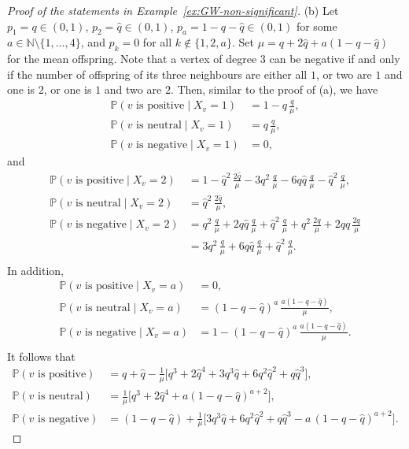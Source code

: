 \documentclass[11pt]{article}
\numberwithin{equation}{section}
\theoremstyle{plain}
\newcommand{\N}{\mathbb N}
\newcommand{\PP}{\mathbb{P}}
\begin{document}
\begin{proof}[Proof of the statements in Example~\ref{ex:GW-non-significant}]
\medskip\noindent 
(b) Let $p_1 = q \in (0,1)$, $p_{2} =\hat{q} \in (0,1)$, $p_a = 1-q-\hat{q}\in (0,1)$ for some $a \in \N\setminus\{1,\ldots, 4\}$, and $p_k = 0$ for all $k \notin \{1,2,a\}$. Set $\mu = q +2\hat{q} + a(1-q-\hat{q})$ for the mean offspring. Note that a vertex of degree $3$ can be negative if and only if the number of offspring of its three neighbours are either all $1$, or two are $1$ and one is $2$, or one is $1$ and two are $2$. Then, similar to the proof of (a), we have
\[
\begin{aligned}
\PP(v \text{ is positive} \mid X_v = 1) &= 1-q\,\frac{q}{\mu},\\
\PP(v \text{ is neutral} \mid X_v = 1) &= q\,\frac{q}{\mu},\\
\PP(v \text{ is negative} \mid X_v = 1) &= 0,
\end{aligned}
\]   
and 
\[
\begin{aligned}
\PP(v \text{ is positive} \mid X_v = 2) &= 1-\hat{q}^{2}\,\frac{2\hat{q}}{\mu}-3q^{2}\,\frac{q}{\mu}-6q\hat{q}\,\frac{q}{\mu}-\hat{q}^{2}\,\frac{q}{\mu},\\
\PP(v \text{ is neutral} \mid X_v = 2) &= \hat{q}^{2}\,\frac{2\hat{q}}{\mu},\\ 
\PP(v \text{ is negative} \mid X_v = 2) &= q^{2}\,\frac{q}{\mu}+2q\hat{q}\,\frac{q}{\mu}+\hat{q}^{2}\,\frac{q}{\mu}+q^{2}\,\frac{2q}{\mu}+2q\hat{q}\,\frac{2q}{\mu}\\
&=3q^{2}\,\frac{q}{\mu}+6q\hat{q}\,\frac{q}{\mu}+\hat{q}^{2}\,\frac{q}{\mu}.\\
\end{aligned}
\]   
 In addition,
\[
\begin{aligned}
\PP(v \text{ is positive} \mid X_v = a) &= 0,\\
\PP(v \text{ is neutral} \mid X_v = a) &= (1-q-\hat{q})^a\,\frac{a(1-q-\hat{q})}{\mu},\\  
\PP(v \text{ is negative} \mid X_v = a) &= 1-(1-q-\hat{q})^a\,\frac{a(1-q-\hat{q})}{\mu}.\\
\end{aligned}
\]   
It follows that
\[
\begin{aligned}
\PP(v \text{ is positive}) &= q+\hat{q} - \frac{1}{\mu}\big[q^3+2\hat{q}^4+3q^3\hat{q}+6q^2 \hat{q}^2+q\hat{q}^3\big],\\
\PP(v \text{ is neutral}) &= \frac{1}{\mu}\big[q^3 +2\hat{q}^4+ a (1-q-\hat{q})^{a+2}\big],\\  
\PP(v \text{ is negative}) &= (1-q-\hat{q}) + \frac{1}{\mu}\big[3q^3\hat{q}+6q^2\hat{q}^2+q\hat{q}^3-a\,(1-q-\hat{q})^{a+2}\big].

\end{aligned}\]
\end{proof}
\end{document}
